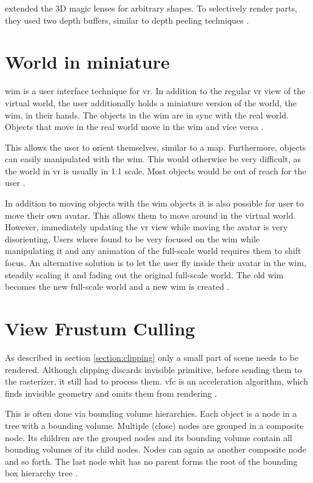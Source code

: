\textcite{ropinski:2004:real} extended the 3D magic lenses for arbitrary shapes. To selectively render parts, they used two depth buffers, similar to depth peeling techniques \cite{everitt:2001:interactive}.

\section{World in miniature}
\Gls{wim} is a user interface technique for \gls{vr}. In addition to the regular \gls{vr} view of the virtual world, the user additionally holds a miniature version of the world, the \gls{wim}, in their hands. The objects in the \gls{wim} are in sync with the real world. Objects that move in the real world move in the \gls{wim} and vice versa \cite{stoakley:1995:virtual}. 

This allows the user to orient themselves, similar to a map. Furthermore, objects can easily manipulated with the \gls{wim}. This would otherwise be very difficult, as the world in \gls{vr} is usually in 1:1 scale. Most objects would be out of reach for the user \cite{stoakley:1995:virtual}.

In addition to moving objects with the \gls{wim} objects it is also possible for user to move their own avatar. This allows them to move around in the virtual world. However, immediately updating the \gls{vr} view while moving the avatar is very disorienting. Users where found to be very focused on the \gls{wim} while manipulating it and any animation of the full-scale world requires them to shift focus. An alternative solution is to let the user fly inside their avatar in the \gls{wim}, steadily scaling it and fading out the original full-scale world. The old \gls{wim} becomes the new full-scale world and a new \gls{wim} is created \cite{pausch:1995:navigation}.




\section{View Frustum Culling}
As described in section \ref{section:clipping} only a small part of scene needs to be rendered. Although clipping discards invisible primitive, before sending them to the rasterizer, it still had to process them. \Gls{vfc} is an acceleration algorithm, which finds invisible geometry and omits them from rendering \cite{assarsson:2000:optimized, akine:2018:realtime}.

This is often done via bounding volume hierarchies. Each object is a node in a tree with a bounding volume. Multiple (close) nodes are grouped in a composite node. Its children are the grouped nodes and its bounding volume contain all bounding volumes of its child nodes. Nodes can again as another composite node and so forth. The last node whit has no parent forms the root of the bounding box hierarchy tree \cite{clark:1976:hierarchical, assarsson:2000:optimized, akine:2018:realtime}.

